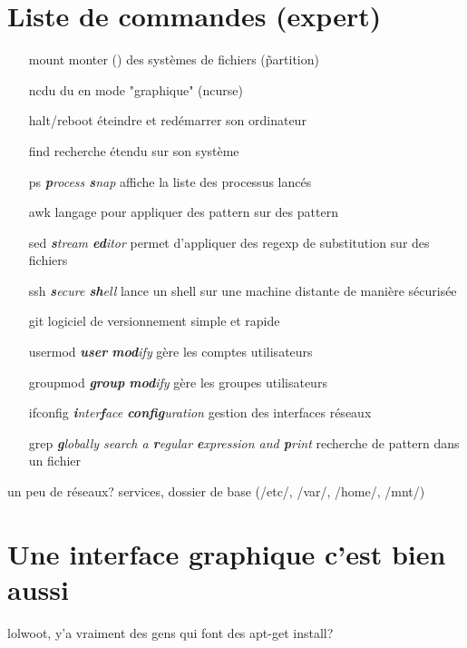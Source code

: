 \documentclass[french, a4paper, 12pt, titlepage]{article}
\begin{document}
\section{Liste de commandes (expert)}
\begin{enumerate}
\item[mount] monter () des systèmes de fichiers (\~partition)
\item[ncdu] du en mode "graphique" (ncurse)
\item[halt/reboot] éteindre et redémarrer son ordinateur
\item[find] recherche étendu sur son système
\item[ps] \emph{\textbf{p}rocess \textbf{s}nap} affiche la liste des processus lancés
\item[awk] langage pour appliquer des pattern sur des pattern
\item[sed] \emph{\textbf{s}tream \textbf{ed}itor} permet d'appliquer des regexp de substitution sur des fichiers
\item[ssh] \emph{\textbf{s}ecure \textbf{sh}ell} lance un shell sur une machine distante de manière sécurisée
\item[git] logiciel de versionnement simple et rapide
\item[usermod] \emph{\textbf{user} \textbf{mod}ify} gère les comptes utilisateurs
\item[groupmod] \emph{\textbf{group} \textbf{mod}ify} gère les groupes utilisateurs
\item[ifconfig] \emph{\textbf{i}nter\textbf{f}ace \textbf{config}uration} gestion des interfaces réseaux
\item[grep] \emph{\textbf{g}lobally search a \textbf{r}egular \textbf{e}xpression and \textbf{p}rint} recherche de pattern dans un fichier
\end{enumerate}
un peu de réseaux? services,
dossier de base (/etc/, /var/, /home/, /mnt/)















\section{Une interface graphique c'est bien aussi}
lolwoot, y'a vraiment des gens qui font des apt-get install? 
\end{document}
